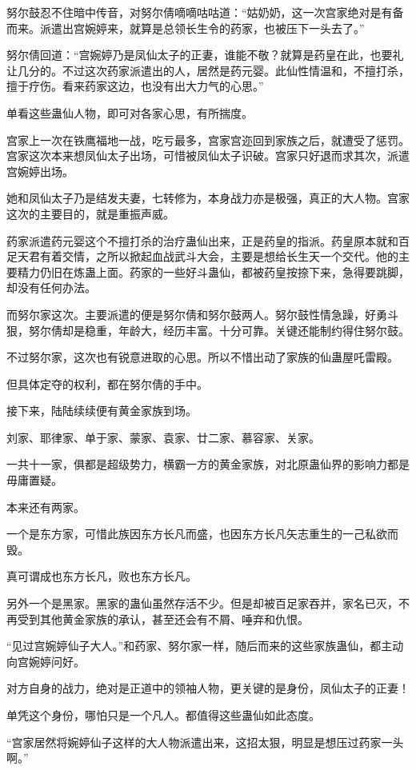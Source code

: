 \begin{this_body}
努尔鼓忍不住暗中传音，对努尔倩嘀嘀咕咕道：“姑奶奶，这一次宫家绝对是有备而来。派遣出宫婉婷来，就算是总领长生令的药家，也被压下一头去了。”

努尔倩回道：“宫婉婷乃是凤仙太子的正妻，谁能不敬？就算是药皇在此，也要礼让几分的。不过这次药家派遣出的人，居然是药元婴。此仙性情温和，不擅打杀，擅于疗伤。看来药家这边，也没有出大力气的心思。”

单看这些蛊仙人物，即可对各家心思，有所揣度。

宫家上一次在铁鹰福地一战，吃亏最多，宫家宫迩回到家族之后，就遭受了惩罚。宫家这次本来想凤仙太子出场，可惜被凤仙太子识破。宫家只好退而求其次，派遣宫婉婷出场。

她和凤仙太子乃是结发夫妻，七转修为，本身战力亦是极强，真正的大人物。宫家这次的主要目的，就是重振声威。

药家派遣药元婴这个不擅打杀的治疗蛊仙出来，正是药皇的指派。药皇原本就和百足天君有着交情，之所以掀起血战武斗大会，主要是想给长生天一个交代。他的主要精力仍旧在炼蛊上面。药家的一些好斗蛊仙，都被药皇按捺下来，急得要跳脚，却没有任何办法。

而努尔家这次。主要派遣的便是努尔倩和努尔鼓两人。努尔鼓性情急躁，好勇斗狠，努尔倩却是稳重，年龄大，经历丰富。十分可靠。关键还能制约得住努尔鼓。

不过努尔家，这次也有锐意进取的心思。所以不惜出动了家族的仙蛊屋吒雷殿。

但具体定夺的权利，都在努尔倩的手中。

接下来，陆陆续续便有黄金家族到场。

刘家、耶律家、单于家、蒙家、袁家、廿二家、慕容家、关家。

一共十一家，俱都是超级势力，横霸一方的黄金家族，对北原蛊仙界的影响力都是毋庸置疑。

本来还有两家。

一个是东方家，可惜此族因东方长凡而盛，也因东方长凡矢志重生的一己私欲而毁。

真可谓成也东方长凡，败也东方长凡。

另外一个是黑家。黑家的蛊仙虽然存活不少。但是却被百足家吞并，家名已灭，不再受到其他黄金家族的承认，甚至还会有不屑、唾弃和仇恨。

“见过宫婉婷仙子大人。”和药家、努尔家一样，随后而来的这些家族蛊仙，都主动向宫婉婷问好。

对方自身的战力，绝对是正道中的领袖人物，更关键的是身份，凤仙太子的正妻！

单凭这个身份，哪怕只是一个凡人。都值得这些蛊仙如此态度。

“宫家居然将婉婷仙子这样的大人物派遣出来，这招太狠，明显是想压过药家一头啊。”


\end{this_body}
